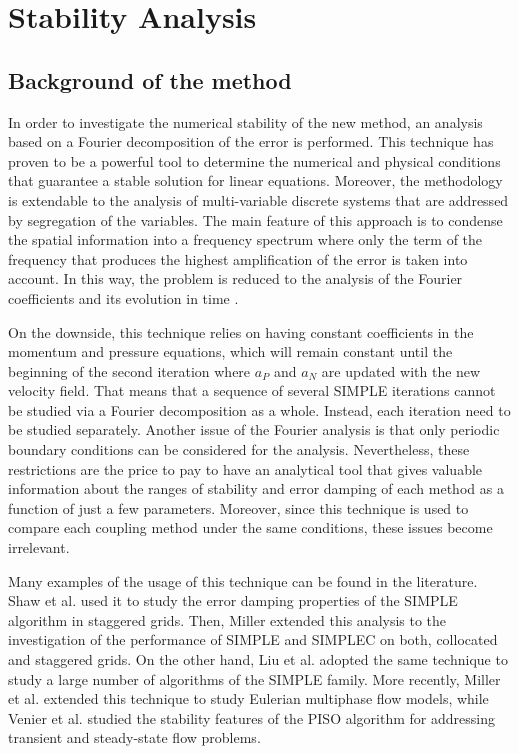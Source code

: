 \documentclass[final,3p,times,11pt,onecolumn]{myElsarticle}
\numberwithin{equation}{section}
\begin{document}
\section{Stability Analysis}
\label{sec:fourier}

\subsection{Background of the method}

In order to investigate the numerical stability of the new method, an analysis based on a Fourier decomposition of the error is performed. This technique has proven to be a powerful tool to determine the numerical and physical conditions that guarantee a stable solution for linear equations. Moreover, the methodology is extendable to the analysis of multi-variable discrete systems that are addressed by segregation of the variables. The main feature of this approach is to condense the spatial information into a frequency spectrum where only the term of the frequency that produces the highest amplification of the error is taken into account. In this way, the problem is reduced to the analysis of the Fourier coefficients and its evolution in time \cite{hirsch}. 

On the downside, this technique relies on having constant coefficients in the momentum and pressure equations, which will remain constant until the beginning of the second iteration where $a_P$ and $a_N$ are updated with the new velocity field. That means that a sequence of several SIMPLE iterations cannot be studied via a Fourier decomposition as a whole. Instead, each iteration need to be studied separately. Another issue of the Fourier analysis is that only periodic boundary conditions can be considered for the analysis. Nevertheless, these restrictions are the price to pay to have an analytical tool that gives valuable information about the ranges of stability and error damping of each method as a function of just a few parameters. Moreover, since this technique is used to compare each coupling method under the same conditions, these issues become irrelevant.

Many examples of the usage of this technique can be found in the literature. Shaw et al. \cite{shaw} used it to study the error damping properties of the SIMPLE algorithm in staggered grids. Then, Miller \cite{miller1} extended this analysis to the investigation of the performance of SIMPLE and SIMPLEC on both, collocated and staggered grids. On the other hand, Liu et al. \cite{liu} adopted the same technique to study a large number of algorithms of the SIMPLE family. More recently, Miller et al. \cite{miller2} extended this technique to study Eulerian multiphase flow models, while Venier et al. \cite{venier} studied the stability features of the PISO algorithm for addressing transient and steady-state flow problems.
\end{document}
